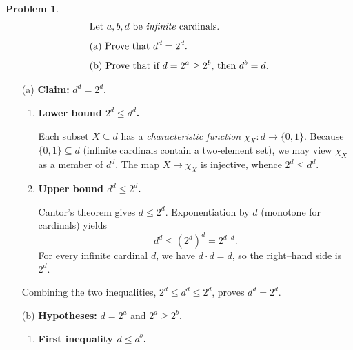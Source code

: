\documentclass[12pt]{article}
\title{}
\author{Jerich Lee}
\date{\today}
\theoremstyle{definition} %
\newtheorem{problem}{Problem}
\theoremstyle{plain} %
\begin{document}
\maketitle
\begin{problem}
  \begin{align}
      &\text{Let $a,b,d$ be \emph{infinite} cardinals.} \\[4pt]
      &\text{(a) Prove that } d^{d}=2^{d}. \\[4pt]
      &\text{(b) Prove that if $d=2^{a}\ge 2^{b}$, then $d^{b}=d$.}
  \end{align}

  \begin{enumerate}
      \item[(a)] \textbf{Claim:} $d^{d}=2^{d}$.

            \begin{enumerate}
                \item \textbf{Lower bound $2^{d}\le d^{d}$.}  
                
                      Each subset $X\subseteq d$ has a \emph{characteristic function}
                      $\chi_{X}:d\to\{0,1\}$.  
                      Because $\{0,1\}\subseteq d$ (infinite cardinals contain a two‑element set),
                      we may view $\chi_{X}$ as a member of $d^{d}$.  
                      The map $X\mapsto\chi_{X}$ is injective, whence $2^{d}\le d^{d}$.

                \item \textbf{Upper bound $d^{d}\le 2^{d}$.}  
                
                      Cantor’s theorem gives $d\le 2^{d}$.  Exponentiation by $d$ (monotone for cardinals) yields
                      \[
                          d^{d}\le (2^{d})^{d}=2^{d\cdot d}.
                      \]
                      For every infinite cardinal $d$, we have $d\cdot d=d$, so the right–hand side is $2^{d}$.
            \end{enumerate}

            Combining the two inequalities, $2^{d}\le d^{d}\le 2^{d}$, proves $d^{d}=2^{d}$.

      \item[(b)] \textbf{Hypotheses:} $d=2^{a}$ and $2^{a}\ge 2^{b}$.

            \begin{enumerate}
                \item \textbf{First inequality $d\le d^{b}$.}  
                

\end{enumerate}
\end{enumerate}
\end{problem}
\end{document}
